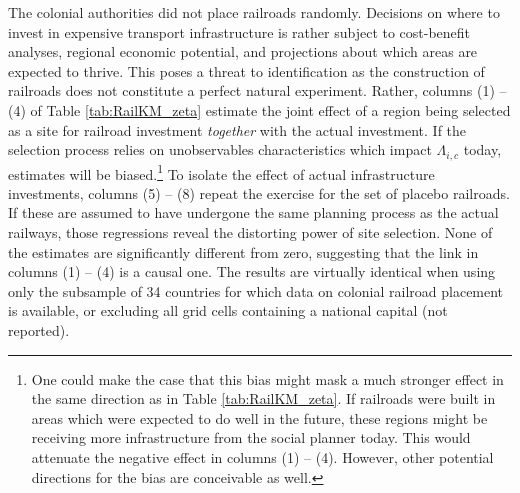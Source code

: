 \documentclass[11pt, oneside]{article}   	%
\begin{document}
The colonial authorities did not place railroads randomly. Decisions on where to invest in expensive transport infrastructure is rather subject to cost-benefit analyses, regional economic potential, and projections about which areas are expected to thrive. This poses a threat to identification as the construction of railroads does not constitute a perfect natural experiment. Rather, columns (1) -- (4) of Table \eqref{tab:RailKM_zeta} estimate the joint effect of a region being selected as a site for railroad investment \emph{together} with the actual investment. If the selection process relies on unobservables characteristics which impact $\Lambda_{i,c}$ today, estimates will be biased.\footnote{One could make the case that this bias might mask a much stronger effect in the same direction as in Table \eqref{tab:RailKM_zeta}. If railroads were built in areas which were expected to do well in the future, these regions might be receiving more infrastructure from the social planner today. This would attenuate the negative effect in columns (1) -- (4). However, other potential directions for the bias are conceivable as well.} To isolate the effect of actual infrastructure investments, columns (5) -- (8) repeat the exercise for the set of placebo railroads. If these are assumed to have undergone the same planning process as the actual railways, those regressions reveal the distorting power of site selection. None of the estimates are significantly different from zero, suggesting that the link in columns (1) -- (4) is a causal one. The results are virtually identical when using only the subsample of 34 countries for which data on colonial railroad placement is available, or excluding all grid cells containing a national capital (not reported).
\end{document}
